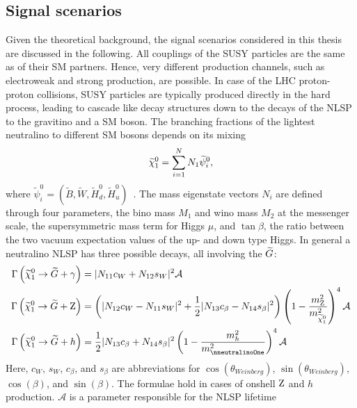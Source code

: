 \subsection{Signal scenarios}\label{sec:SMS}
Given the theoretical background, the signal scenarios considered in this thesis are discussed in the following. All couplings of the SUSY particles are the same as of their SM partners. Hence, very different production channels, such as electroweak and strong production, are possible. In case of the LHC proton-proton collisions, SUSY particles are typically produced directly in the hard process, leading to cascade like decay structures down to the decays of the NLSP to the gravitino and a SM boson. The branching fractions of the lightest neutralino to different SM bosons depends on its mixing
\begin{equation}
 \widetilde{\chi}^{0}_{1} = \sum_{i=1}^{N} N_{1} \widetilde{\psi}_i^0,
\end{equation}
where $\widetilde{\psi}_i^0=(\widetilde{B},\widetilde{W},\widetilde{H}_d^0,\widetilde{H}_u^0)$~\cite{NLSPDecay}. The mass eigenstate vectors $N_i$ are defined through four parameters, the bino mass $M_1$ and wino mass $M_2$ at the messenger scale, the supersymmetric mass term for Higgs $\mu$, and $\tan{\beta}$, the ratio between the two vacuum expectation values of the up- and down type Higgs. In general a neutralino NLSP has three possible decays, all involving the $\widetilde{G}$:
\begin{align}
 \Gamma\left(\neutralinoOne\to\gravitino+\PGg\right) & = |N_{11}c_W+N_{12}s_W|^2 \mathcal{A}                                                                                                                       \\
 \Gamma\left(\neutralinoOne\to\gravitino+\PZ\right)  & = \left(|N_{12}c_W - N_{11}s_W|^2 +\frac{1}{2}|N_{13}c_{\beta}-N_{14}s_{\beta}|^2\right)\left(1-\frac{m_{\PZ}^2}{m_{\neutralinoOne}^2}\right)^4 \mathcal{A} \\
 \Gamma\left(\neutralinoOne\to\gravitino+h\right)    & = \frac{1}{2}|N_{13}c_{\beta}+N_{14}s_{\beta}|^2\left(1-\frac{m_h^2}{m_{\nneutralinoOne}^2}\right)^4 \mathcal{A}                                            
\end{align}
Here, $c_W$, $s_W$, $c_\beta$, and $s_\beta$ are abbreviations for $\cos(\theta_{Weinberg})$, $\sin(\theta_{Weinberg})$, $\cos(\beta)$, and $\sin(\beta)$. The formulae hold in cases of onshell $\mathrm{Z}$ and $h$ production. $\mathcal{A}$ is a parameter responsible for the NLSP lifetime~\cite{NLSP1,NLSP2}
